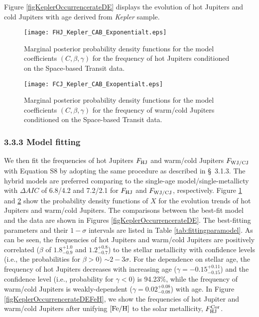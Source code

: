 \documentclass[twocolumn]{pnas-new}
\begin{document}
Figure \ref{figKeplerOccurrencerateDE} displays the evolution of hot Jupiters and cold Jupiters with age derived from {\it Kepler} sample.


\begin{figure}[!t]
\centering
\texttt{[image: FHJ\_Kepler\_CAB\_Exponentialt.eps]}
\caption{Marginal posterior probability density functions for the model coefficients $(C, \beta, \gamma)$ for the frequency of hot Jupiters conditioned on the Space-based Transit data.
\label{figFHJfittingFeHAgeKepler}}
\end{figure}

\begin{figure}[!t]
\centering
\texttt{[image: FCJ\_Kepler\_CAB\_Exopentialt.eps]}
\caption{Marginal posterior probability density functions for the model coefficients $(C, \beta, \gamma)$ for the frequency of warm/cold Jupiters conditioned on the Space-based Transit data.
\label{figFCJfittingFeHAgeKepler}}
\end{figure}


\subsubsection*{3.3.3 Model fitting}
\label{sec.obs.SBTS.fitting}
We then fit the frequencies of hot Jupiters $F_{\rm HJ}$ and warm/cold Jupiters $F_{\rm WJ/CJ}$ with Equation S8 by adopting the same procedure as described in \S~3.1.3.
The hybrid models are preferred comparing to the single-age model/single-metallicty with $\Delta AIC$ of 6.8/4.2 and 7.2/2.1 for $F_{\rm HJ}$ and $F_{\rm WJ/CJ}$, respectively.  
Figure \ref{figFHJfittingFeHAgeKepler} and \ref{figFCJfittingFeHAgeKepler} show the probability density functions of $X$ for the evolution trends of hot Jupiters and warm/cold Jupiters.
The comparisons between the best-fit model and
the data are shown in Figures \ref{figKeplerOccurrencerateDE}.
The best-fitting parameters and their $1-\sigma$ intervals are listed in Table \ref{tab:fittingparamodel}.
As can be seen, the frequencies of hot Jupiters and warm/cold Jupiters are positively correlated ($\beta$ of $1.8^{+1.0}_{-0.9}$ and $1.2^{+0.8}_{-0.7}$) to the stellar metallicity with confidence levels (i.e., the probabilities for $\beta>0$) $\sim 2-3\sigma$.
For the dependence on stellar age, the frequency of hot Jupiters decreases with increasing age ($\gamma = -0.15^{+0.11}_{-0.15}$) and the confidence level (i.e., probability for $\gamma<0$) is 94.23\%,
while the frequency of warm/cold Jupiters is weakly-dependent ($\gamma = 0.02^{+0.08}_{-0.08}$) with age.
In Figure \ref{figKeplerOccurrencerateDEFeH}, we show the frequencies of hot Jupiter and warm/cold Jupiters after unifying $\rm [Fe/H]$ to the solar metallicity, $F^{\rm Cor}_{\rm HJ}$.
\end{document}

